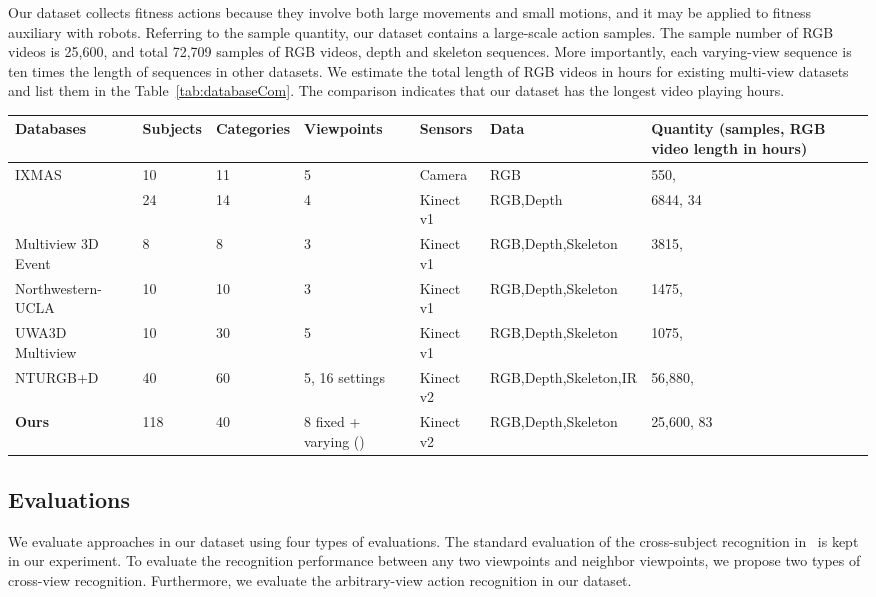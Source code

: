 \documentclass[journal]{IEEEtran}
\begin{document}
Our dataset collects fitness actions because they involve both large movements and small motions, and it may be applied to fitness auxiliary with robots.
Referring to the sample quantity, our dataset contains a large-scale action samples. The sample number of RGB videos is 25,600, and total 72,709 samples of RGB videos, depth and skeleton sequences. More importantly, each varying-view sequence is ten times the length of sequences in other datasets. We estimate the total length of RGB videos in hours for existing multi-view datasets and list them in the Table~\ref{tab:databaseCom}. The comparison indicates that our dataset has the longest video playing hours.

\begin{table*}[!t] \footnotesize
\begin{center}
\caption{Comparison with other multi-view action datasets.}
\label{tab:databaseCom}
\begin{tabular}{|p{3cm}|p{1cm}|p{1.2cm}|p{2cm}|p{2cm}|p{2.8cm}|p{3cm}|}
\hline
Databases & Subjects & Categories & Viewpoints & Sensors & Data & Quantity (samples, RGB video length in hours)\\
\hline
IXMAS~\cite{IXMAS2006} & 10  & 11 & 5 & Camera & RGB & 550, \\
 ~\cite{ChengACT42012} & 24 & 14 & 4 & Kinect v1 & RGB,Depth & 6844, 34 \\
Multiview 3D Event~\cite{Wei4DHOI2013} & 8 & 8 & 3 & Kinect v1 & RGB,Depth,Skeleton & 3815,  \\
Northwestern-UCLA~\cite{WangMSTAOG2014} & 10 & 10 & 3 & Kinect v1 & RGB,Depth,Skeleton & 1475,  \\
UWA3D Multiview~\cite{RahmaniUWA3D2016} & 10 & 30 & 5 & Kinect v1 & RGB,Depth,Skeleton & 1075,  \\
NTURGB+D~\cite{ShahroudyNTU2016} & 40 & 60 & 5, 16 settings & Kinect v2 & RGB,Depth,Skeleton,IR  & 56,880,  \\
\textbf{Ours} & 118 & 40 & 8 fixed + varying () & Kinect v2 & RGB,Depth,Skeleton & 25,600, 83 \\
\hline
\end{tabular}
\end{center}
\end{table*}

\subsection{Evaluations}
We evaluate approaches in our dataset using four types of evaluations. The standard evaluation of the cross-subject recognition in~\cite{ShahroudyNTU2016} is kept in our experiment. To evaluate the recognition performance between any two viewpoints and neighbor viewpoints, we propose two types of cross-view recognition. Furthermore, we evaluate the arbitrary-view action recognition in our dataset.
\end{document}
